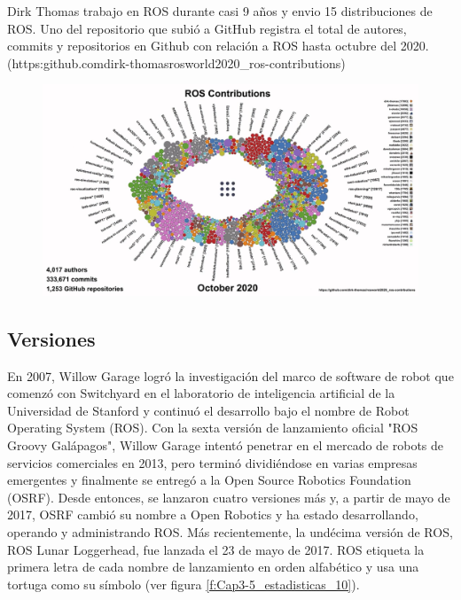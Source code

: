             Dirk Thomas trabajo en ROS durante casi 9 años y envio 15 distribuciones de ROS. Uno del repositorio que subió a GitHub registra el total de autores, commits y repositorios en Github con relación a ROS hasta octubre del 2020. (https:\/\/github.com\/dirk-thomas\/rosworld2020\_ros-contributions)
        
            \begin{figure}[htb]
            \centering
            \includegraphics[width=0.93\linewidth]{Main/Chapter3/Images3/repo_git_2.png}
            \caption{}
            \label{f:Cap3-5_estadisticas_9}
            \end{figure} 
    
        \newpage

    \subsection{Versiones}
            En 2007, Willow Garage logró la investigación del marco de software de robot que comenzó con Switchyard en el laboratorio de inteligencia artificial de la Universidad de Stanford y continuó el desarrollo bajo el nombre de Robot Operating System (ROS). Con la sexta versión de lanzamiento oficial "ROS Groovy Galápagos", Willow Garage intentó penetrar en el mercado de robots de servicios comerciales en 2013, pero terminó dividiéndose en varias empresas emergentes y finalmente se entregó a la Open Source Robotics Foundation (OSRF). Desde entonces, se lanzaron cuatro versiones más y, a partir de mayo de 2017, OSRF cambió su nombre a Open Robotics y ha estado desarrollando, operando y administrando ROS. Más recientemente, la undécima versión de ROS, ROS Lunar Loggerhead, fue lanzada el 23 de mayo de 2017. ROS etiqueta la primera letra de cada nombre de lanzamiento en orden alfabético y usa una tortuga como su símbolo (ver figura \ref{f:Cap3-5_estadisticas_10}).
            
